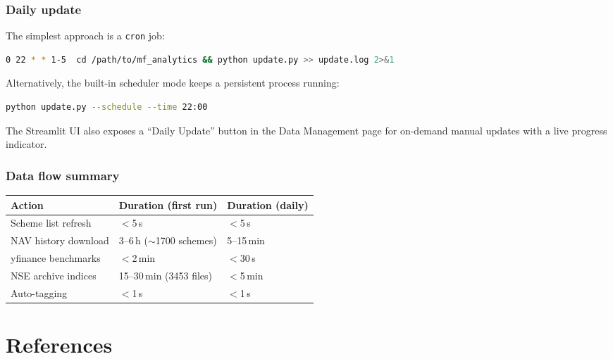 \documentclass[12pt, a4paper]{article}
\begin{document}
\subsubsection{Daily update}

The simplest approach is a \texttt{cron} job:

\begin{lstlisting}[style=pycode,language=bash,caption={Cron entry for weekday updates at 22:00 IST}]
0 22 * * 1-5  cd /path/to/mf_analytics && python update.py >> update.log 2>&1
\end{lstlisting}

Alternatively, the built-in scheduler mode keeps a persistent process running:

\begin{lstlisting}[style=pycode,language=bash,caption={Persistent scheduler mode}]
python update.py --schedule --time 22:00
\end{lstlisting}

The Streamlit UI also exposes a ``Daily Update'' button in the Data Management
page for on-demand manual updates with a live progress indicator.

\subsubsection{Data flow summary}

\begin{center}
\begin{tabular}{@{}lll@{}}
\toprule
\textbf{Action} & \textbf{Duration (first run)} & \textbf{Duration (daily)} \\
\midrule
Scheme list refresh & $<$5\,s & $<$5\,s \\
NAV history download & 3--6\,h ($\sim$1700 schemes) & 5--15\,min \\
yfinance benchmarks & $<$2\,min & $<$30\,s \\
NSE archive indices & 15--30\,min (3453 files) & $<$5\,min \\
Auto-tagging & $<$1\,s & $<$1\,s \\
\bottomrule
\end{tabular}
\end{center}

\section{References}
\end{document}
